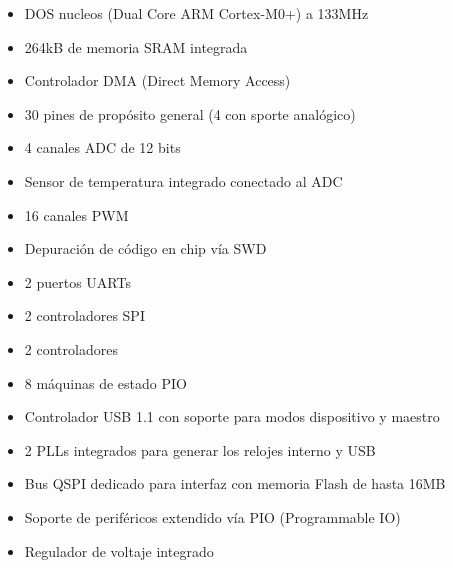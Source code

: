\begin{itemize}[nosep]
	\item DOS nucleos (Dual Core ARM Cortex-M0+) a 133MHz
	\item 264kB de memoria SRAM integrada
	\item Controlador DMA (Direct Memory Access)
	\item 30 pines de propósito general (4 con sporte analógico)
	\item 4 canales ADC de 12 bits
	\item Sensor de temperatura integrado conectado al ADC
	\item 16 canales PWM
	\item Depuración de código en chip vía SWD
	\item 2 puertos UARTs
	\item 2 controladores SPI
	\item 2 controladores \IIC{}
	\item 8 máquinas de estado PIO
	\item Controlador USB 1.1 con soporte para modos dispositivo y maestro
	\item 2 PLLs integrados para generar los relojes interno y USB
	\item Bus QSPI dedicado para interfaz con memoria Flash de hasta 16MB
	\item Soporte de periféricos extendido vía PIO (Programmable IO)
	\item Regulador de voltaje integrado
\end{itemize}



